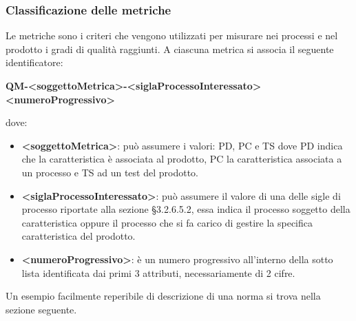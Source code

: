 		\subsubsection{Classificazione delle metriche}
			Le metriche sono i criteri che vengono utilizzati per misurare nei processi e nel prodotto i gradi di qualità raggiunti. A ciascuna metrica si associa il seguente identificatore:
			\begin{center}
				\textbf{QM-<soggettoMetrica>-<siglaProcessoInteressato><numeroProgressivo>}
			\end{center}
			dove:
			\begin{itemize}
				\item\textbf{<soggettoMetrica>}: può assumere i valori: PD, PC e TS dove PD indica che la caratteristica è associata al prodotto,  PC la caratteristica associata a un processo e TS ad un test del prodotto.
				\item\textbf{<siglaProcessoInteressato>}: può assumere il valore di una delle sigle di processo riportate alla sezione §3.2.6.5.2, essa indica il processo soggetto della caratteristica oppure il processo che si fa carico di gestire la specifica caratteristica del prodotto.
				\item\textbf{<numeroProgressivo>}: è un numero progressivo all’interno della sotto lista identificata dai primi 3 attributi, necessariamente di 2 cifre.
			\end{itemize}
			Un esempio facilmente reperibile di descrizione di una norma si trova nella sezione seguente.
